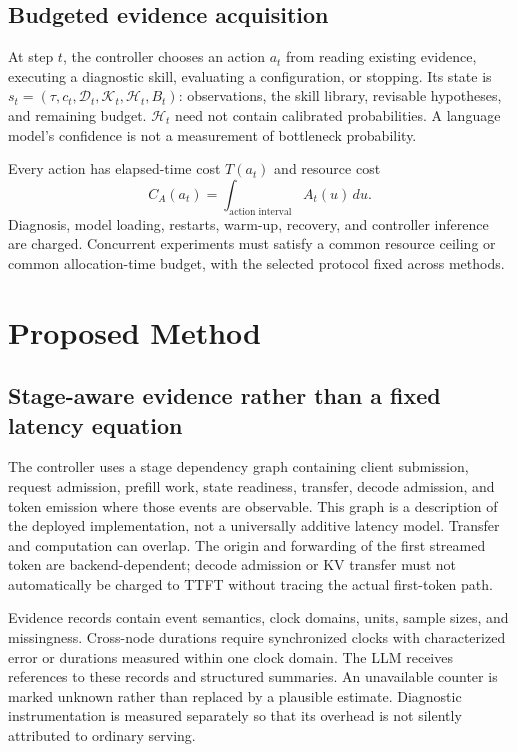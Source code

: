 \documentclass[11pt,a4paper]{article}
\begin{document}
\subsection{Budgeted evidence acquisition}
At step $t$, the controller chooses an action $a_t$ from reading existing evidence, executing a diagnostic skill, evaluating a configuration, or stopping. Its state is $s_t=(\tau,c_t,\mathcal{D}_t,\mathcal{K}_t,\mathcal{H}_t,B_t)$: observations, the skill library, revisable hypotheses, and remaining budget. $\mathcal{H}_t$ need not contain calibrated probabilities. A language model's confidence is not a measurement of bottleneck probability.

Every action has elapsed-time cost $T(a_t)$ and resource cost
\begin{equation}
 C_A(a_t)=\int_{\text{action interval}} A_t(u)\,du.
\end{equation}
Diagnosis, model loading, restarts, warm-up, recovery, and controller inference are charged. Concurrent experiments must satisfy a common resource ceiling or common allocation-time budget, with the selected protocol fixed across methods.

\section{Proposed Method}
\subsection{Stage-aware evidence rather than a fixed latency equation}
The controller uses a stage dependency graph containing client submission, request admission, prefill work, state readiness, transfer, decode admission, and token emission where those events are observable. This graph is a description of the deployed implementation, not a universally additive latency model. Transfer and computation can overlap. The origin and forwarding of the first streamed token are backend-dependent; decode admission or KV transfer must not automatically be charged to TTFT without tracing the actual first-token path.

Evidence records contain event semantics, clock domains, units, sample sizes, and missingness. Cross-node durations require synchronized clocks with characterized error or durations measured within one clock domain. The LLM receives references to these records and structured summaries. An unavailable counter is marked unknown rather than replaced by a plausible estimate. Diagnostic instrumentation is measured separately so that its overhead is not silently attributed to ordinary serving.
\end{document}

